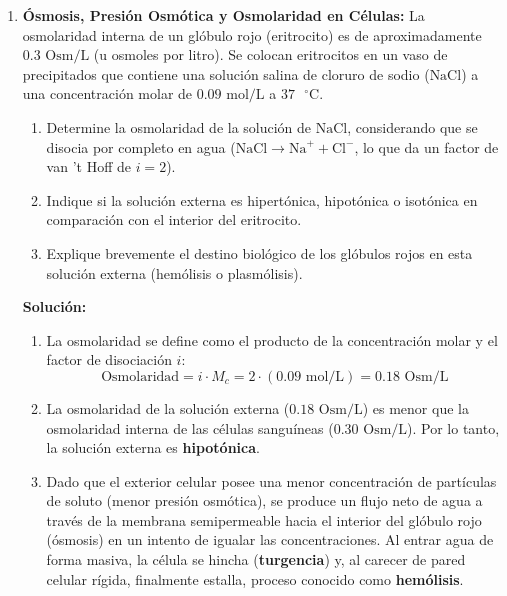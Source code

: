 \documentclass[12pt,letterpaper]{article}
\begin{document}
\begin{enumerate}
    \vspace{0.3cm}
    \item \textbf{Ósmosis, Presión Osmótica y Osmolaridad en Células:} La osmolaridad interna de un glóbulo rojo (eritrocito) es de aproximadamente $0.3 \text{ Osm/L}$ (u osmoles por litro). Se colocan eritrocitos en un vaso de precipitados que contiene una solución salina de cloruro de sodio ($\text{NaCl}$) a una concentración molar de $0.09 \text{ mol/L}$ a $37 \text{ }^{\circ}\text{C}$.
    \begin{enumerate}
        \item Determine la osmolaridad de la solución de $\text{NaCl}$, considerando que se disocia por completo en agua ($\text{NaCl} \rightarrow \text{Na}^+ + \text{Cl}^-$, lo que da un factor de van 't Hoff de $i = 2$).
        \item Indique si la solución externa es hipertónica, hipotónica o isotónica en comparación con el interior del eritrocito.
        \item Explique brevemente el destino biológico de los glóbulos rojos en esta solución externa (hemólisis o plasmólisis).
    \end{enumerate}
    
    \textbf{Solución:}
    \begin{enumerate}
        \item La osmolaridad se define como el producto de la concentración molar y el factor de disociación $i$:
        \[
        \text{Osmolaridad} = i \cdot M_c = 2 \cdot (0.09 \text{ mol/L}) = 0.18 \text{ Osm/L}
        \]
        \item La osmolaridad de la solución externa ($0.18 \text{ Osm/L}$) es menor que la osmolaridad interna de las células sanguíneas ($0.30 \text{ Osm/L}$). Por lo tanto, la solución externa es \textbf{hipotónica}.
        \item Dado que el exterior celular posee una menor concentración de partículas de soluto (menor presión osmótica), se produce un flujo neto de agua a través de la membrana semipermeable hacia el interior del glóbulo rojo (ósmosis) en un intento de igualar las concentraciones. Al entrar agua de forma masiva, la célula se hincha (\textbf{turgencia}) y, al carecer de pared celular rígida, finalmente estalla, proceso conocido como \textbf{hemólisis}.
    \end{enumerate}


\end{enumerate}
\end{document}
